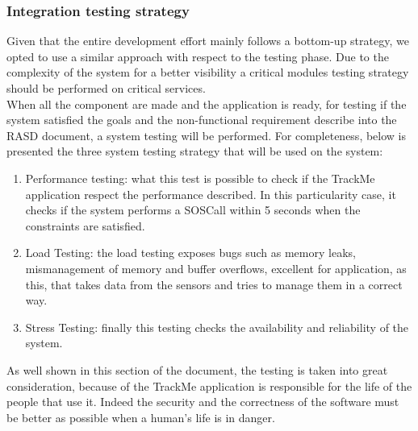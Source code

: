 \subsubsection{Integration testing strategy}
Given that the entire development effort mainly follows a bottom-up strategy, we opted to use a similar approach with respect to the testing phase. Due to the complexity of the system for a better visibility a critical modules testing strategy should be performed on critical services.\\
When all the component are made and the application is ready, for testing if the system satisfied the goals and the non-functional requirement describe into the RASD document, a system testing will be performed. For completeness, below is presented the three system testing strategy that will be used on the system: 
\begin{enumerate}
\item Performance testing: what this test is possible to check if the TrackMe application respect the performance described. In this particularity case, it checks if the system performs a SOSCall within 5 seconds when the constraints are satisfied.
\item Load Testing: the load testing exposes bugs such as memory leaks, mismanagement of memory and buffer overflows, excellent for application, as this, that takes data from the sensors and tries to manage them in a correct way.
\item Stress Testing: finally this testing checks the availability and reliability of the system.
\end{enumerate}
As well shown in this section of the document, the testing is taken into great consideration, because of the TrackMe application is responsible for the life of the people that use it. Indeed the security and the correctness of the software must be better as possible when a human's life is in danger. 